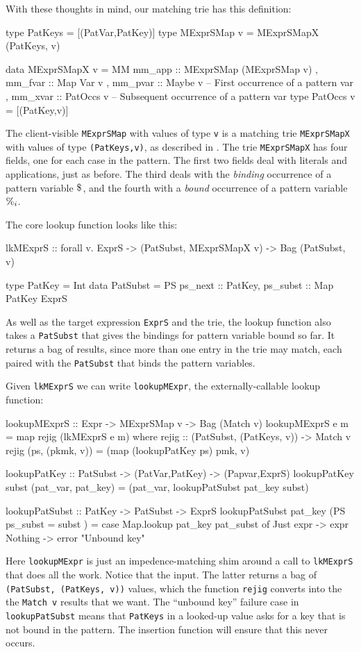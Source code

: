 \documentclass[acmsmall]{acmart}
\theoremstyle{theorem}
\theoremstyle{definition}
\theoremstyle{remark}
\begin{document}
With these thoughts in mind, our matching trie has this definition:
\begin{code}
type PatKeys     = [(PatVar,PatKey)]
type MExprSMap v = MExprSMapX (PatKeys, v)

data MExprSMapX v
    = MM { mm_app  :: MExprSMap (MExprSMap v)
         , mm_fvar :: Map Var v
         , mm_pvar :: Maybe v     -- First occurrence of a pattern var
         , mm_xvar :: PatOccs v   -- Subsequent occurrence of a pattern var
       }
type PatOccs v = [(PatKey,v)]
\end{code}
The client-visible \lstinline{MExprSMap} with values of type \lstinline{v}
is a matching trie \lstinline{MExprSMapX} with values of type \lstinline{(PatKeys,v)},
as described in .
The trie \lstinline{MExprSMapX} has four fields, one for each case in the pattern.
The first two fields deal with literals and applications, just as before. The third deals with the \emph{binding} occurrence
of a pattern variable $\$_{}$, and the fourth with a \emph{bound} occurrence of
a pattern variable $\%_{i}$.

The core lookup function looks like this:
\begin{code}
lkMExprS :: forall v. ExprS -> (PatSubst, MExprSMapX v) -> Bag (PatSubst, v)

type PatKey = Int
data PatSubst = PS { ps_next  :: PatKey, ps_subst :: Map PatKey ExprS }
\end{code}
As well as the target expression \lstinline{ExprS} and the trie, the lookup function also takes
a \lstinline{PatSubst} that gives the bindings for pattern variable bound so far.
It returns a bag of results, since more than one entry in the trie may match,
each paired with the \lstinline{PatSubst} that binds the pattern variables.

Given \lstinline{lkMExprS} we can write \lstinline{lookupMExpr},
the externally-callable lookup function:
\begin{code}
lookupMExprS :: Expr -> MExprSMap v -> Bag (Match v)
lookupMExprS e m = map rejig (lkMExprS e m)
  where
    rejig :: (PatSubst, (PatKeys, v)) -> Match v
    rejig (ps, (pkmk, v)) = (map (lookupPatKey ps) pmk, v)

lookupPatKey :: PatSubst -> (PatVar,PatKey) -> (Papvar,ExprS)
lookupPatKey subst (pat_var, pat_key) = (pat_var, lookupPatSubst pat_key subst)

lookupPatSubst :: PatKey -> PatSubst -> ExprS
lookupPatSubst pat_key (PS { ps_subst = subst })
  = case Map.lookup pat_key pat_subst of
      Just expr -> expr
      Nothing   -> error "Unbound key"
\end{code}
Here \lstinline{lookupMExpr} is just an impedence-matching shim around
a call to \lstinline{lkMExprS} that does all the work.  Notice that the
input.  The latter returns a bag of \lstinline{(PatSubst, (PatKeys, v))}
values, which the function \lstinline{rejig} converts into the
the \lstinline{Match v} results that we want.  The ``unbound key''
failure case in \lstinline{lookupPatSubst} means that
\lstinline{PatKeys} in a looked-up value asks for a key that is not
bound in the pattern.  The insertion function will ensure that this
never occurs.
\end{document}
